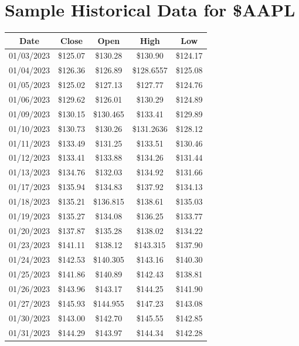\documentclass[12pt,final]{article}
\begin{document}
\appendix
\section{Sample Historical Data for \$AAPL}

\begin{center}
\begin{tabular}{| c | c | c | c | c |}
\hline
Date & Close & Open & High & Low \\ \hline
01/03/2023 & \$125.07 & \$130.28 & \$130.90 & \$124.17 \\ \hline
01/04/2023 & \$126.36 & \$126.89 & \$128.6557 & \$125.08 \\ \hline
01/05/2023 & \$125.02 & \$127.13 & \$127.77 & \$124.76 \\ \hline
01/06/2023 & \$129.62 & \$126.01 & \$130.29 & \$124.89 \\ \hline
01/09/2023 & \$130.15 & \$130.465 & \$133.41 & \$129.89 \\ \hline
01/10/2023 & \$130.73 & \$130.26 & \$131.2636 & \$128.12 \\ \hline
01/11/2023 & \$133.49 & \$131.25 & \$133.51 & \$130.46 \\ \hline
01/12/2023 & \$133.41 & \$133.88 & \$134.26 & \$131.44 \\ \hline
01/13/2023 & \$134.76 & \$132.03 & \$134.92 & \$131.66 \\ \hline
01/17/2023 & \$135.94 & \$134.83 & \$137.92 & \$134.13 \\ \hline
01/18/2023 & \$135.21 & \$136.815 & \$138.61 & \$135.03 \\ \hline
01/19/2023 & \$135.27 & \$134.08 & \$136.25 & \$133.77 \\ \hline
01/20/2023 & \$137.87 & \$135.28 & \$138.02 & \$134.22 \\ \hline
01/23/2023 & \$141.11 & \$138.12 & \$143.315 & \$137.90 \\ \hline
01/24/2023 & \$142.53 & \$140.305 & \$143.16 & \$140.30 \\ \hline
01/25/2023 & \$141.86 & \$140.89 & \$142.43 & \$138.81 \\ \hline
01/26/2023 & \$143.96 & \$143.17 & \$144.25 & \$141.90 \\ \hline
01/27/2023 & \$145.93 & \$144.955 & \$147.23 & \$143.08 \\ \hline
01/30/2023 & \$143.00 & \$142.70 & \$145.55 & \$142.85 \\ \hline
01/31/2023 & \$144.29 & \$143.97 & \$144.34 & \$142.28 \\ \hline
\end{tabular}
\end{center}
\end{document}
